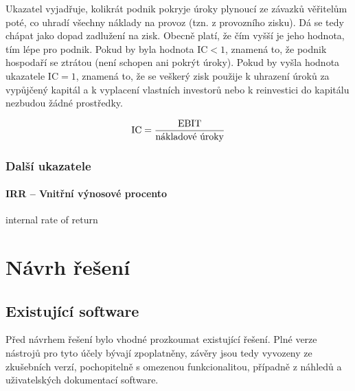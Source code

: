 Ukazatel vyjadřuje, kolikrát podnik pokryje úroky plynoucí ze závazků věřitelům poté, co uhradí všechny náklady na provoz (tzn. z provozního zisku). Dá se tedy chápat jako dopad zadlužení na zisk. Obecně platí, že čím vyšší je jeho hodnota, tím lépe pro podnik. Pokud by byla hodnota IC$<1$, znamená to, že podnik hospodaří se ztrátou (není schopen ani pokrýt úroky). Pokud by vyšla hodnota ukazatele IC$=1$, znamená to, že se veškerý zisk použije k uhrazení úroků za vypůjčený kapitál a k vyplacení vlastních investorů nebo k reinvestici do kapitálu nezbudou žádné prostředky.

$$\text{IC} = \dfrac{\text{EBIT}}{\text{nákladové úroky}}$$








\subsection{Další ukazatele}

\subsubsection{IRR -- Vnitřní výnosové procento}
internal rate of return







































\chapter{Návrh řešení}



\section{Existující software}
Před návrhem řešení bylo vhodné prozkoumat existující řešení. Plné verze nástrojů pro tyto účely bývají zpoplatněny, závěry jsou tedy vyvozeny ze zkušebních verzí, pochopitelně s omezenou funkcionalitou, případně z náhledů a uživatelských dokumentací software.

